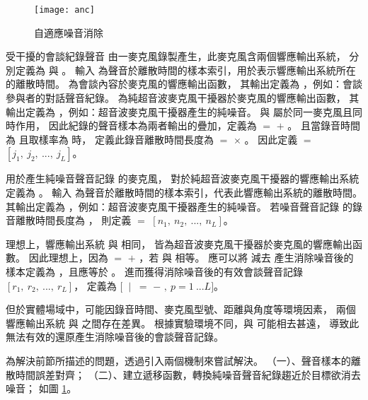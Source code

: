 \begin{figure}[H]
    \centering
    \texttt{[image: anc]}
    \caption{自適應噪音消除}\label{fig:anc}
\end{figure}

    受干擾的會談紀錄聲音 \DEFrecJ 由一麥克風錄製產生，此麥克風含兩個響應輸出系統，
分別定義為 \DEFfuncMicConv{\DEFpause} 與 \DEFfuncMicUSJ{\DEFpause}。
輸入 \DEFpause 為聲音於離散時間的樣本索引，用於表示響應輸出系統所在的離散時間。
\DEFfuncMicConv{\DEFpause} 為會談內容於麥克風的響應輸出函數，
其輸出定義為 \DEFmicConv，例如：會談參與者的對話聲音紀錄。
\DEFfuncMicUSJ{\DEFpause} 為純超音波麥克風干擾器於麥克風的響應輸出函數，
其輸出定義為 \DEFmicUSJ，例如：超音波麥克風干擾器產生的純噪音。
\DEFfuncMicConv{\DEFpause} 與 \DEFfuncMicUSJ{\DEFpause} 屬於同一麥克風且同時作用，
因此紀錄的聲音樣本為兩者輸出的疊加，定義為 \DEFmicRecJ $=$ \DEFmicConv $+$ \DEFmicUSJ。
且當錄音時間為 \DEFtimeREC 且取樣率為 \DEFsamplerate 時，
定義此錄音離散時間長度為 \DEFtimeLen $=$ \DEFsamplerate $\times$ \DEFtimeREC。
因此定義 \DEFrecJ $=$ $[j_{1}, ~j_{2}, ~ ...,~ j_{L}]$。

    用於產生純噪音聲音記錄 \DEFrecN 的麥克風，
對於純超音波麥克風干擾器的響應輸出系統定義為 \DEFfuncMicUSN{\DEFpause}。
輸入 \DEFpause 為聲音於離散時間的樣本索引，代表此響應輸出系統的離散時間。
\DEFfuncMicUSN{\DEFpause} 其輸出定義為 \DEFmicUSN ，例如：超音波麥克風干擾器產生的純噪音。
若噪音聲音記錄 \DEFrecN 的錄音離散時間長度為 \DEFtimeLen，
則定義 \DEFrecN $=$ $[n_{1}, ~n_{2}, ~ ...,~ n_{L}]$。

    理想上，響應輸出系統 \DEFfuncMicUSN{\DEFpause} 與 \DEFfuncMicUSJ{\DEFpause} 相同，
皆為超音波麥克風干擾器於麥克風的響應輸出函數。
因此理想上，因為 \DEFmicRecJ $=$ \DEFmicConv $+$ \DEFmicUSJ，若 \DEFmicUSJ 與 \DEFmicUSN 相等。
應可以將 \DEFmicRecJ 減去 \DEFmicUSN 產生消除噪音後的樣本定義為 \DEFmicRecREV，且應等於 \DEFmicConv。
進而獲得消除噪音後的有效會談聲音記錄 $[r_{1}, ~r_{2}, ~ ...,~ r_L]$，
定義為 $[$ \DEFmicRecREV $~|~$ \DEFmicRecREV $=$ \DEFmicRecJ $-$ \DEFmicUSN $,~  p=1~...L]$。

    但於實體場域中，可能因錄音時間、麥克風型號、距離與角度等環境因素，
兩個響應輸出系統 \DEFfuncMicUSN{\DEFpause} 與 \DEFfuncMicUSJ{\DEFpause} 之間存在差異。
根據實驗環境不同，\DEFmicRecREV 與 \DEFmicConv 可能相去甚遠，
導致此無法有效的還原產生消除噪音後的會談聲音記錄。

    為解決前節所描述的問題，透過引入兩個機制來嘗試解決。
（一）、聲音樣本的離散時間誤差對齊；
（二）、建立遞移函數，轉換純噪音聲音紀錄趨近於目標欲消去噪音；
如圖 \ref{fig:anc}。

